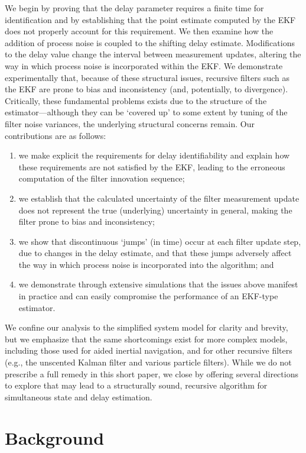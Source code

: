 \documentclass[letterpaper,10pt,conference]{ieeeconf}
\theoremstyle{definition}
\begin{document}
We begin by proving that the delay parameter requires a finite time for identification and by establishing that the point estimate computed by the EKF does not properly account for this requirement.
%
We then examine how the addition of process noise is coupled to the shifting delay estimate.
%
Modifications to the delay value change the interval between measurement updates, altering the way in which process noise is incorporated within the EKF.
%
We demonstrate experimentally that, because of these structural issues, recursive filters such as the EKF are prone to bias and inconsistency (and, potentially, to divergence).
%
Critically, these fundamental problems exists due to the structure of the estimator---although they can be `covered up' to some extent by tuning of the filter noise variances, the underlying structural concerns remain.
%
Our contributions are as follows:
%
\begin{enumerate}
	\item we make explicit the requirements for delay identifiability and explain how these requirements are not satisfied by the EKF, leading to the erroneous computation of the filter innovation sequence;
	\item we establish that the calculated uncertainty of the filter measurement update does not represent the true (underlying) uncertainty in general, making the filter prone to bias and inconsistency;
	\item we show that discontinuous `jumps' (in time) occur at each filter update step, due to changes in the delay estimate, and that these jumps adversely affect the way in which process noise is incorporated into the algorithm; and
	\item we demonstrate through extensive simulations that the issues above manifest in practice and can easily compromise the performance of an EKF-type estimator.
\end{enumerate}

We confine our analysis to the simplified system model for clarity and brevity, but we emphasize that the same shortcomings exist for more complex models, including those used for aided inertial navigation, and for other recursive filters (e.g., the unscented Kalman filter and various particle filters).
%
While we do not prescribe a full remedy in this short paper, we close by offering several directions to explore that may lead to a structurally sound, recursive algorithm for simultaneous state and delay estimation.  

\section{Background}
\label{sec:background}
\end{document}
